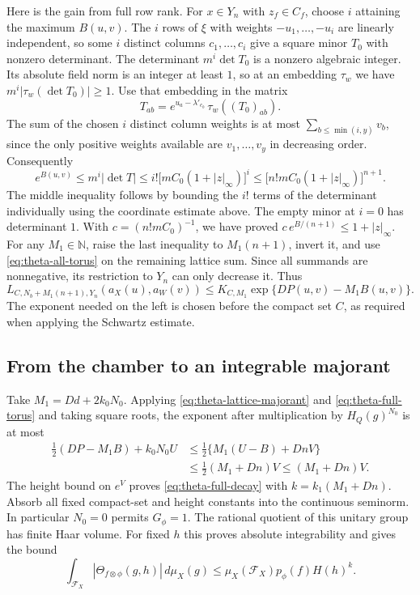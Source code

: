 Here is the gain from full row rank. For \(x\in Y_n\) with
\(z_f\in C_f\), choose \(i\) attaining the maximum \(B(u,v)\).
The \(i\) rows of \(\xi\) with weights \(-u_1,\ldots,-u_i\)
are linearly independent, so some \(i\) distinct columns
\(c_1,\ldots,c_i\) give a square minor \(T_0\) with nonzero
determinant. The determinant \(m^i\det T_0\) is a nonzero algebraic
integer. Its absolute field norm is an integer at least \(1\),
so at an embedding \(\tau_w\) we have
\(m^i|\tau_w(\det T_0)|\ge1\). Use that embedding in the matrix
\[
 T_{ab}=e^{u_a-\lambda'_{c_b}}\,\tau_w((T_0)_{ab}).
\]
The sum of the chosen \(i\) distinct column weights is at most
\(\sum_{b\le\min(i,y)}v_b\), since the only positive weights
available are \(v_1,\ldots,v_y\) in decreasing order. Consequently
\[
 e^{B(u,v)}
 \le m^i|\det T|
 \le i!\big[m C_0(1+|z|_\infty)\big]^i
 \le \big[n!m C_0(1+|z|_\infty)\big]^{n+1}.
\]
The middle inequality follows by bounding the \(i!\) terms of the
determinant individually using the coordinate estimate above.
The empty minor at \(i=0\) has determinant \(1\). With
\(c=(n!m C_0)^{-1}\), we have proved
\(c\,e^{B/(n+1)}\le1+|z|_\infty\).
For any \(M_1\in\mathbb N\), raise the last inequality to
\(M_1(n+1)\), invert it, and use \eqref{eq:theta-all-torus} on
the remaining lattice sum. Since all summands are nonnegative, its
restriction to \(Y_n\) can only decrease it. Thus
\begin{equation}
 L_{C,N_b+M_1(n+1),Y_n}(a_X(u),a_W(v))
       \le K_{C,M_1}\exp\{DP(u,v)-M_1 B(u,v)\}.
 \label{eq:theta-full-torus}
\end{equation}
The exponent needed on the left is chosen before the compact set
\(C\), as required when applying the Schwartz estimate.

\subsection{From the chamber to an integrable majorant}

Take \(M_1=Dd+2k_0N_0\). Applying
\eqref{eq:theta-lattice-majorant} and \eqref{eq:theta-full-torus}
and taking square roots, the exponent after multiplication by
\(H_Q(g)^{N_0}\) is at most
\begin{align*}
 \tfrac12(DP-M_1B)+k_0N_0U
 &\le \tfrac12\{M_1(U-B)+DnV\}\\
 &\le \tfrac12(M_1+Dn)V
 \le (M_1+Dn)V .
\end{align*}
The height bound on \(e^V\) proves \eqref{eq:theta-full-decay}
with \(k=k_1(M_1+Dn)\). Absorb all fixed compact-set and height
constants into the continuous seminorm. In particular \(N_0=0\)
permits \(G_\phi=1\). The rational quotient of this unitary group
has finite Haar volume. For fixed \(h\) this proves absolute
integrability and gives the bound
\[
 \int_{\mathcal F_X}|\Theta_{f\otimes\phi}(g,h)|\,d\mu_X(g)
       \le\mu_X(\mathcal F_X)p_\phi(f)H(h)^k .
\]

